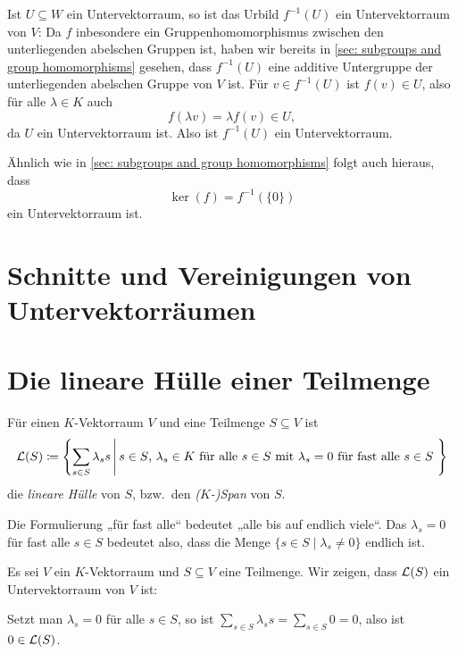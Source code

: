 Ist $U \subseteq W$ ein Untervektorraum, so ist das Urbild $f^{-1}(U)$ ein Untervektorraum von $V$: Da $f$ inbesondere ein Gruppenhomomorphismus zwischen den unterliegenden abelschen Gruppen ist, haben wir bereits in \ref{sec: subgroups and group homomorphisms} gesehen, dass $f^{-1}(U)$ eine additive Untergruppe der unterliegenden abelschen Gruppe von $V$ ist. Für $v \in f^{-1}(U)$ ist $f(v) \in U$, also für alle $\lambda \in K$ auch
\[
 f(\lambda v) = \lambda f(v) \in U,
\]
da $U$ ein Untervektorraum ist. Also ist $f^{-1}(U)$ ein Untervektorraum.


\begin{bem}
 Ähnlich wie in \ref{sec: subgroups and group homomorphisms} folgt auch hieraus, dass
 \[
  \ker(f) = f^{-1}(\{0\})
 \]
 ein Untervektorraum ist.
\end{bem}





\section{Schnitte und Vereinigungen von Untervektorräumen}





\section{Die lineare Hülle einer Teilmenge}
\begin{defi}
 Für einen $K$-Vektorraum $V$ und eine Teilmenge $S \subseteq V$ ist
 \[
  \mathcal{L}(S)
  \coloneqq
  \left\{
   \sum_{s \in S} \lambda_s s
   \,\middle|\,
   \text{$s \in S$, $\lambda_s \in K$ für alle $s \in S$ mit $\lambda_s = 0$ für fast alle $s \in S$ }
  \right\}
 \]
 die \emph{lineare Hülle} von $S$, bzw.\ den \emph{($K$-)Span} von $S$.
\end{defi}

\begin{bem}
 Die Formulierung „für fast alle“ bedeutet „alle bis auf endlich viele“. Das $\lambda_s = 0$ für fast alle $s \in S$ bedeutet also, dass die Menge $\{s \in S \mid \lambda_s \neq 0\}$ endlich ist.
\end{bem}

Es sei $V$ ein $K$-Vektorraum und $S \subseteq V$ eine Teilmenge. Wir zeigen, dass $\mathcal{L}(S)$ ein Untervektorraum von $V$ ist:

Setzt man $\lambda_s = 0$ für alle $s \in S$, so ist $\sum_{s \in S} \lambda_s s = \sum_{s \in S} 0 = 0$, also ist $0 \in \mathcal{L}(S)$.

